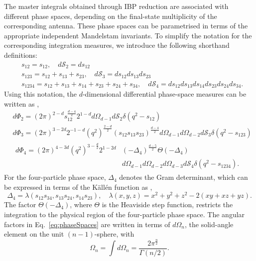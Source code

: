 The master integrals obtained through IBP reduction are associated with different phase spaces,
depending on the final-state multiplicity of the corresponding antenna. These phase spaces can be
parametrised in terms of the appropriate independent Mandelstam invariants. To simplify the notation
for the corresponding integration measures, we introduce the following shorthand definitions:
\begin{equation}
    \begin{split}
        &s_{12}=s_{12},\quad d\mathcal S_2 = ds_{12}\\
        &s_{123} = s_{12}+s_{13}+s_{23},\quad d\mathcal S_3 = ds_{12}ds_{13}ds_{23}\\
        &s_{1234} = s_{12}+s_{13}+s_{14}+s_{23}+s_{24}+s_{34},\quad d\mathcal S_4 = ds_{12}ds_{13}ds_{14}ds_{23}ds_{24}ds_{34}.
    \end{split}
\end{equation}
Using this notation, the $d$-dimensional differential phase-space measures can be written as
\cite{GehrmannDeRidder0311276,Anastasiou:2002yz},
\begin{equation}\label{eq:phaseSpaces}
    \begin{split}
        &d\Phi_2 = (2\pi)^{2-d}s_{12}^{\frac{d-4}{2}}2^{1-d}d\Omega_{d-1}d\mathcal S_2\delta\!\left(q^2-s_{12}\right)\\
        &d\Phi_3 = (2\pi)^{3-2d}2^{-1-d}\!\left(q^2\right)^{\frac{2-d}{2}}(s_{12}s_{13}s_{23})^{\frac{d-4}{2}}d\Omega_{d-1}d\Omega_{d-2}d\mathcal S_3\delta\!\left(q^2-s_{123}\right)\\
        &\begin{split}
            d\Phi_4 = (2\pi)^{4-3d}\!\left(q^2\right)^{3-\frac d2}2^{1-2d}&(-\Delta_4)^{\frac{d-5}{2}}\Theta(-\Delta_4)\\ &d\Omega_{d-1}d\Omega_{d-2}d\Omega_{d-3}d\mathcal S_4\delta\!\left(q^2-s_{1234}\right).
         \end{split}
    \end{split}
\end{equation}
For the four-particle phase space, $\Delta_4$ denotes the Gram determinant, which can be expressed in terms of the Källén function as
\cite{GehrmannDeRidder0311276,Anastasiou:2002yz},
\begin{equation}
    \Delta_4=\lambda(s_{12}s_{34}, s_{13}s_{24}, s_{14}s_{23}),\quad \lambda(x, y, z) = x^2+y^2+z^2-2(xy+xz+yz).
\end{equation}
The factor $\Theta(-\Delta_4)$, where $\Theta$ is the Heaviside step function, restricts the integration
to the physical region of the four-particle phase space. The angular factors in
Eq.~\eqref{eq:phaseSpaces} are written in terms of $d\Omega_n$, the solid-angle element on the unit
$(n-1)$-sphere, with
\begin{equation}
    \Omega_n=\int d\Omega_n=\frac{2\pi^{\frac n2}}{\Gamma(n/2)}.
\end{equation}

